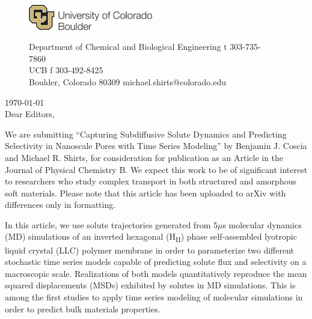 \documentclass[fontsize=11pt]{article}
\begin{document}
	\graphicspath{{./figures/}}

	\begin{figure}
	\centering
	\begin{minipage}{0.37\textwidth}
	\includegraphics[width=2.14in,left]{CUBoulder.pdf}
	\end{minipage}
	\begin{minipage}{0.62\textwidth}
	\scriptsize
	\noindent Department of Chemical and Biological Engineering \hfill t 303-735-7860~~~~~~~~~~~~~~~~~~ \\
	 UCB \hfill f 303-492-8425~~~~~~~~~~~~~~~~~~ \\
	\noindent Boulder, Colorado 80309 \hfill michael.shirts@colorado.edu \\
	\end{minipage}
	\end{figure}
	
	\noindent \today \\

	\noindent Dear Editors,\\
	
	\newcommand{\ManuscriptTitle}{Capturing Subdiffusive Solute Dynamics and 
	Predicting Selectivity in Nanoscale Pores with Time Series Modeling}
	
	We are submitting ``\ManuscriptTitle'' by Benjamin J. Coscia and Michael R.
	Shirts, for consideration for publication as an Article in the Journal of 
	Physical Chemistry B. We expect this work to be of significant interest to 
	researchers who study complex transport in both structured and amorphous 
	soft materials. Please note that this article has been uploaded to arXiv with
	differences only in formatting.  %
	
	In this article, we use solute trajectories generated from 5$\mu$s molecular
	dynamics (MD) simulations of an inverted hexagonal (H\textsubscript{II}) phase
	self-assembled lyotropic liquid crystal (LLC) polymer membrane in order to 
	parameterize two different stochastic time series models capable of predicting
	solute flux and selectivity on a macroscopic scale. Realizations of both models
	quantitatively reproduce the mean squared displacements (MSDs) exhibited by 
	solutes in MD simulations. This is among the first studies to apply time 
	series modeling of molecular simulations in order to predict bulk materials properties.
\end{document}
